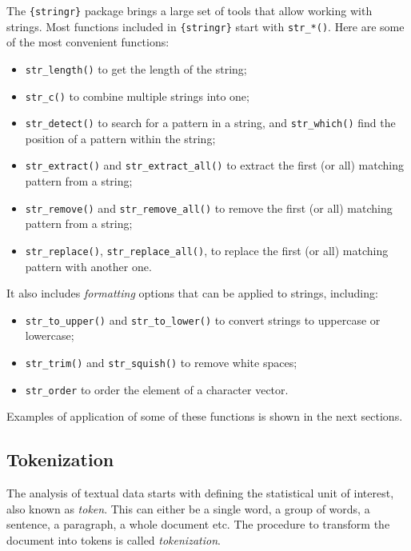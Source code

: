 \documentclass[
]{krantz}
\providecommand{\tightlist}{%
  \setlength{\itemsep}{0pt}\setlength{\parskip}{0pt}}
\begin{document}
The \texttt{\{stringr\}} package brings a large set of tools that allow working with strings. Most functions included in \texttt{\{stringr\}} start with \texttt{str\_*()}. Here are some of the most convenient functions:

\begin{itemize}
\tightlist
\item
  \texttt{str\_length()} to get the length of the string;
\item
  \texttt{str\_c()} to combine multiple strings into one;
\item
  \texttt{str\_detect()} to search for a pattern in a string, and \texttt{str\_which()} find the position of a pattern within the string;
\item
  \texttt{str\_extract()} and \texttt{str\_extract\_all()} to extract the first (or all) matching pattern from a string;
\item
  \texttt{str\_remove()} and \texttt{str\_remove\_all()} to remove the first (or all) matching pattern from a string;
\item
  \texttt{str\_replace()}, \texttt{str\_replace\_all()}, to replace the first (or all) matching pattern with another one.
\end{itemize}

It also includes \emph{formatting} options that can be applied to strings, including:

\begin{itemize}
\tightlist
\item
  \texttt{str\_to\_upper()} and \texttt{str\_to\_lower()} to convert strings to uppercase or lowercase;
\item
  \texttt{str\_trim()} and \texttt{str\_squish()} to remove white spaces;
\item
  \texttt{str\_order} to order the element of a character vector.
\end{itemize}

Examples of application of some of these functions is shown in the next sections.

\hypertarget{tokenization}{%
\subsection{Tokenization}\label{tokenization}}

The analysis of textual data starts with defining the statistical unit of interest, also known as \emph{token}. This can either be a single word, a group of words, a sentence, a paragraph, a whole document etc. The procedure to transform the document into tokens is called \emph{tokenization}.
\end{document}
